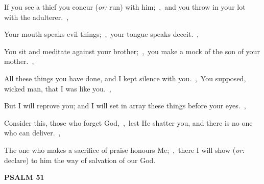 \documentclass[12pt,twoside,a5paper]{article}
\newcommand{\psalm}[1]{\textbf{PSALM {#1}}\nopagebreak}
\newcommand{\translationoption}[1]{\emph{or:} #1}
\begin{document}
\begin{normalparskip}
  If you see a thief you concur (\translationoption{run}) with him;~\sep\ and you throw in your lot with the adulterer.~\sep

  Your mouth speaks evil things;~\sep\ your tongue speaks deceit.~\sep

  You sit and meditate against your brother;~\sep\ you make a mock of the son of your mother.~\sep

  All these things you have done, and I kept silence with you.~\sep\ You supposed, wicked man, that I was like you.~\sep

  But I will reprove you; and I will set in array these things before your eyes.~\sep

  Consider this, those who forget God,~\sep\ lest He shatter you, and there is no one who can deliver.~\sep

  The one who makes a sacrifice of praise honours Me;~\sep\ there I will show (\translationoption{declare}) to him the way of salvation of our God.
\end{normalparskip}

\psalm{51}
\end{document}
